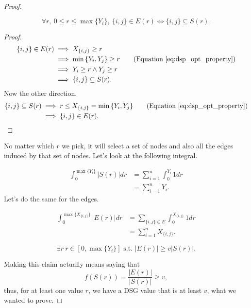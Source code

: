\begin{proof}
\begin{claim}
	\begin{equation}
	\forall r,\ 0 \leq r \leq \max{\{Y_i\}},\ \{i, j\} \in E(r) \Longleftrightarrow \{i, j\} \subseteq S(r).
	\end{equation}
\end{claim}
\begin{proof}
	\begin{align}
		\{i, j\} \in E(r) &\implies X_{\{i, j\}} \geq r\\
		& \implies \min{\{Y_i, Y_j\}} \geq r \tag{Equation \ref{eq:dsp_opt_property}}\\
		& \implies Y_i \geq r \wedge Y_j \geq r\\
		& \implies \{i, j\} \subseteq S(r).
	\end{align}
	Now the other direction.
	\begin{align}
	\{i, j\} \subseteq S(r)&\implies r \leq X_{\{i, j\}} = \min{\{Y_i, Y_j\}}\tag{Equation \ref{eq:dsp_opt_property}}\\
	& \implies \{i, j\} \in E(r).
	\end{align}
\end{proof}

No matter which $r$ we pick, it will select a set of nodes and also all the edges induced by that set of nodes. Let's look at the following integral.

\begin{align}
\int_0^{\max{\{Y_i\}}} |S(r)|dr &= \sum_{i=1}^n \int_0^{Y_i} 1 dr\\
&= \sum_{i=1}^n Y_i.
\end{align}
Let's do the same for the edges.

\begin{align}
\int_0^{\max{\{X_{\{i,j\}}\}}} |E(r)|dr &=  \sum_{\{i, j\} \in E} \int_0^{X_{\{i,j\}}} 1 dr\\
&= \sum_{i=1}^n X_{\{i, j\}}.
\end{align}

\begin{claim}
	\begin{equation}
	\exists r\ r \in [0, \max{\{Y_i\}}] \text{ s.t. } |E(r)| \geq v|S(r)|.
	\end{equation}
\end{claim}
Making this claim actually means saying that 
\begin{equation}
 f(S(r)) = \frac{|E(r)|}{|S(r)|} \geq v,
\end{equation}
thus, for at least one value $r$, we have a DSG value that is at least $v$, what we wanted to prove.


\end{proof}
